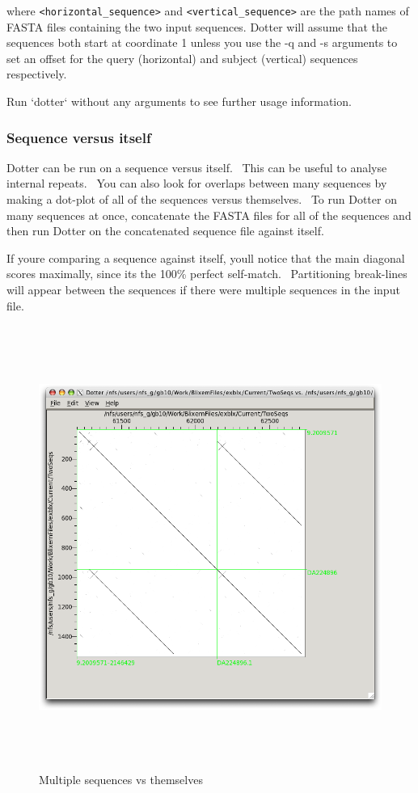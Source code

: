\documentclass{report}
\begin{document}
where \texttt{{\textless}horizontal\_sequence{\textgreater}} and
\texttt{{\textless}vertical\_sequence{\textgreater}} are the path names of FASTA
files containing the two input sequences.
Dotter will assume that the sequences both start at coordinate 1 unless
you use the {}-q and {}-s arguments to set an offset for the query
(horizontal) and subject (vertical) sequences respectively.

\bigskip

Run {\textquoteleft}dotter{\textquoteleft} without any arguments to see
further usage information.

{\color[rgb]{0.30980393,0.5058824,0.7411765}\subsubsection[Sequence versus itself]{Sequence versus itself}}
{Dotter can be run on a sequence versus itself. \ This can be useful to
analyse internal repeats. \ You can also look for overlaps between many
sequences by making a dot-plot of all of the sequences versus
themselves. \ To run Dotter on many sequences at once, concatenate the
FASTA files for all of the sequences and then run Dotter on the
concatenated sequence file against itself.}

\bigskip

{If you{\textquotesingle}re comparing a sequence against itself,
you{\textquotesingle}ll notice that the main diagonal scores maximally,
since it{\textquotesingle}s the 100\% perfect self-match.
\ Partitioning break-lines will appear between the sequences if there
were multiple sequences in the input file.}

\begin{figure}
 \centering
 \color[rgb]{0.30980393,0.5058824,0.7411765}
 \includegraphics[width=15.24cm,height=14.508cm]{img_window_dotter_self.png}
 \caption{Multiple sequences vs themselves}
\end{figure}
\end{document}
